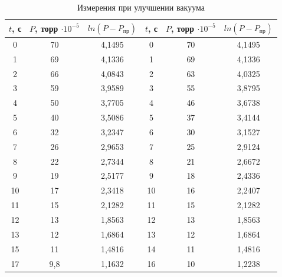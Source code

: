 \documentclass[a4paper, 12pt]{article}
\begin{document}
\begin{table}[H]
\begin{tabular}{|ccc|ccc|}
\multicolumn{1}{|c|}{$t$, с}  & \multicolumn{1}{c|}{$P$, торр $\cdot 10^{-5}$}   & \multicolumn{1}{c|}{$ln(P-P_{\text{пр}})$} & \multicolumn{1}{|c|}{$t$, с}  & \multicolumn{1}{c|}{$P$, торр $\cdot 10^{-5}$}   & \multicolumn{1}{c|}{$ln(P-P_{\text{пр}})$} \\ \hline
\multicolumn{1}{|c|}{0}  & \multicolumn{1}{c|}{70}  & 4,1495  & \multicolumn{1}{c|}{0}  & \multicolumn{1}{c|}{70} & 4,1495  \\ \hline
\multicolumn{1}{|c|}{1}  & \multicolumn{1}{c|}{69}  & 4,1336  & \multicolumn{1}{c|}{1}  & \multicolumn{1}{c|}{69} & 4,1336  \\ \hline
\multicolumn{1}{|c|}{2}  & \multicolumn{1}{c|}{66}  & 4,0843  & \multicolumn{1}{c|}{2}  & \multicolumn{1}{c|}{63} & 4,0325  \\ \hline
\multicolumn{1}{|c|}{3}  & \multicolumn{1}{c|}{59}  & 3,9589  & \multicolumn{1}{c|}{3}  & \multicolumn{1}{c|}{55} & 3,8795  \\ \hline
\multicolumn{1}{|c|}{4}  & \multicolumn{1}{c|}{50}  & 3,7705  & \multicolumn{1}{c|}{4}  & \multicolumn{1}{c|}{46} & 3,6738  \\ \hline
\multicolumn{1}{|c|}{5}  & \multicolumn{1}{c|}{40}  & 3,5086  & \multicolumn{1}{c|}{5}  & \multicolumn{1}{c|}{37} & 3,4144  \\ \hline
\multicolumn{1}{|c|}{6}  & \multicolumn{1}{c|}{32}  & 3,2347  & \multicolumn{1}{c|}{6}  & \multicolumn{1}{c|}{30} & 3,1527  \\ \hline
\multicolumn{1}{|c|}{7}  & \multicolumn{1}{c|}{26}  & 2,9653  & \multicolumn{1}{c|}{7}  & \multicolumn{1}{c|}{25} & 2,9124  \\ \hline
\multicolumn{1}{|c|}{8}  & \multicolumn{1}{c|}{22}  & 2,7344  & \multicolumn{1}{c|}{8}  & \multicolumn{1}{c|}{21} & 2,6672  \\ \hline
\multicolumn{1}{|c|}{9}  & \multicolumn{1}{c|}{19}  & 2,5177  & \multicolumn{1}{c|}{9}  & \multicolumn{1}{c|}{18} & 2,4336  \\ \hline
\multicolumn{1}{|c|}{10} & \multicolumn{1}{c|}{17}  & 2,3418  & \multicolumn{1}{c|}{10} & \multicolumn{1}{c|}{16} & 2,2407  \\ \hline
\multicolumn{1}{|c|}{11} & \multicolumn{1}{c|}{15}  & 2,1282  & \multicolumn{1}{c|}{11} & \multicolumn{1}{c|}{15} & 2,1282  \\ \hline
\multicolumn{1}{|c|}{12} & \multicolumn{1}{c|}{13}  & 1,8563  & \multicolumn{1}{c|}{12} & \multicolumn{1}{c|}{13} & 1,8563  \\ \hline
\multicolumn{1}{|c|}{13} & \multicolumn{1}{c|}{12}  & 1,6864  & \multicolumn{1}{c|}{13} & \multicolumn{1}{c|}{12} & 1,6864  \\ \hline
\multicolumn{1}{|c|}{15} & \multicolumn{1}{c|}{11}  & 1,4816  & \multicolumn{1}{c|}{14} & \multicolumn{1}{c|}{11} & 1,4816  \\ \hline
\multicolumn{1}{|c|}{17} & \multicolumn{1}{c|}{9,8} & 1,1632  & \multicolumn{1}{c|}{16} & \multicolumn{1}{c|}{10} & 1,2238  \\ \hline
\end{tabular}
\caption{Измерения при улучшении вакуума}
\end{table}
\end{document}
